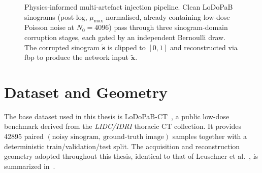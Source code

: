 \begin{figure}[!htb]
    \caption[Physics-informed multi-artefact injection pipeline.]{%
        Physics-informed multi-artefact injection pipeline. Clean \mbox{LoDoPaB} sinograms (post-log,
        $\mu_{\max}$-normalised, already containing low-dose Poisson noise at $N_0{=}4096$) pass through three
        sinogram-domain corruption stages, each gated by an independent Bernoulli draw. The corrupted sinogram
        $\tilde{\mathbf{s}}$ is clipped to $[0,1]$ and reconstructed via \gls{fbp} to produce the network input $\tilde{\mathbf{x}}$.}
    \label{fig:meth_pipeline}
\end{figure}

\section{Dataset and Geometry}
\label{sec:meth_dataset}

The base dataset used in this thesis is \mbox{LoDoPaB-CT}~\cite{Leuschner2021}, a public low-dose benchmark derived from the \emph{LIDC/IDRI} thoracic CT collection. It provides \num{42895} paired $(\text{noisy sinogram},\,\text{ground-truth image})$ samples together with a deterministic train/validation/test split. The acquisition and reconstruction geometry adopted throughout this thesis, identical to that of Leuschner et al.~\cite{Leuschner2021}, is summarized in~.

